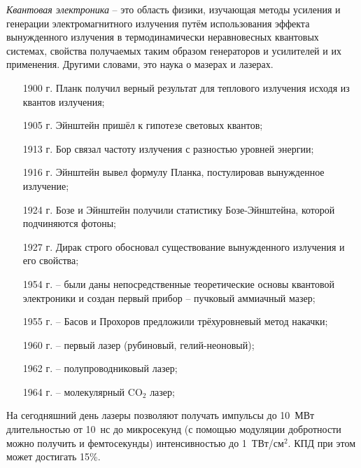 

\emph{Квантовая электроника} -- это область физики, изучающая методы усиления
и генерации электромагнитного излучения путём использования эффекта
вынужденного излучения в термодинамически неравновесных квантовых системах,
свойства получаемых таким образом генераторов и усилителей и их применения.
Другими словами, это наука о мазерах и лазерах.

\begin{enumerate}
    \item[1900 г.] Планк получил верный результат для теплового излучения исходя
        из квантов излучения;
    \item[1905 г.] Эйнштейн пришёл к гипотезе световых квантов;
    \item[1913 г.] Бор связал частоту излучения с разностью уровней энергии;
    \item[1916 г.] Эйнштейн вывел формулу Планка, постулировав вынужденное
        излучение;
    \item[1924 г.] Бозе и Эйнштейн получили статистику Бозе-Эйнштейна, которой
        подчиняются фотоны;
    \item[1927 г.] Дирак строго обосновал существование вынужденного излучения
        и его свойства;
\end{enumerate}

\begin{enumerate}
    \item[1954 г.] -- были даны непосредственные теоретические основы
        квантовой электроники и создан первый прибор -- пучковый аммиачный
        мазер;
    \item[1955 г.] -- Басов и Прохоров предложили трёхуровневый метод накачки;
    \item[1960 г.] -- первый лазер (рубиновый, гелий-неоновый);
    \item[1962 г.] -- полупроводниковый лазер;
    \item[1964 г.] -- молекулярный \( \mathrm{CO_2} \) лазер;
\end{enumerate}

На сегодняшний день лазеры позволяют получать импульсы до 10~МВт длительностью
от 10~нс до микросекунд (с помощью модуляции добротности можно получить и
фемтосекунды) интенсивностью до 1~ТВт/\(\text{см}^2\). КПД при этом может
достигать 15\%.

